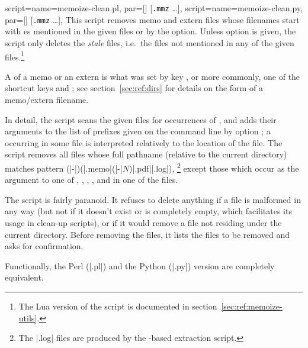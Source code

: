 \documentclass[a4paper,11pt]{article}
\begin{document}
\begin{doc}{
    script={name=memoize-clean.pl, par=[] [\texttt{.mmz} \dots]},
    script={name=memoize-clean.py, par=[] [\texttt{.mmz} \dots]},
  }
  This script removes memo and extern files whose filenames start with
  es mentioned in the given \dmmz files or by the
   option.  Unless option
   is given, the script only deletes the
  \emph{stale} files, i.e.\ the files not mentioned in any of the given \dmmz
  files.\footnote{The Lua version of the script is documented in
    section~\ref{sec:ref:memoize-utils}.}

  A  of a memo or an extern is what was set by key
  , or more commonly, one of the shortcut keys 
  and ; see section~\ref{sec:ref:dirs} for details on the
  form of a memo/extern filename.

  In detail, the script scans the given \dmmz files for occurrences of
  , and adds their  arguments to the list of
  prefixes given on the command line by option
  ; a  occurring in some \dmmz
  file is interpreted relatively to the location of the \dmmz file.  The script
  removes all files whose full pathname (relative to the current directory)
  matches pattern
  (|-|)(|.memo|\alt(|-|$N$)|.pdf|\alt|.log|),%
  \footnote{The |.log| files are produced by the -based extraction
    script.}  except those which occur as the  argument to one
  of , , ,
  ,  and  in one
  of the \dmmz files.

  The script is fairly paranoid.  It refuses to delete anything if a \dmmz file
  is malformed in any way (but not if it doesn't exist or is completely empty,
  which facilitates its usage in clean-up scripts), or if it would remove a
  file not residing under the current directory.  Before removing the files, it
  lists the files to be removed and asks for confirmation.

  Functionally, the Perl (|.pl|) and the Python (|.py|) version are completely
  equivalent.
  

\end{doc}
\end{document}
